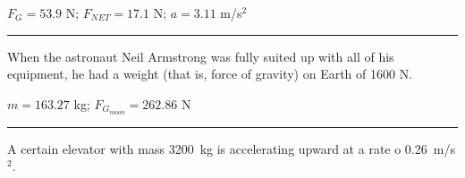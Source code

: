 \documentclass[12pt]{exam}
\newcommand{\h}{$\heartsuit$}
\renewcommand{\d}{$\diamondsuit$}
\newcommand{\s}{$\spadesuit$}
\renewcommand{\ku}[3]{
  \ifprintanswers
    #1 #2 #3
  \else
    \begin{tabular}
      {p{.2\textwidth}|p{.2\textwidth}|p{.2\textwidth}}
      \small Knowns/Unknowns    &
      \small  Plug \& Chug      & 
      \small Answer w/ Units \\
      \center #1 &
      \center #2 &
      \center #3 \\[3em]
    \end{tabular}
  \fi
}
\begin{document}
\begin{questions}

  \begin{solution}
    $F_G=53.9$ N; $F_{NET}=17.1$ N; $a=3.11$ m/s$^2$
  \end{solution}

\vs
\ifprintanswers
  \hrule \vs
\else
  \pagebreak

\fi

\question
  When the astronaut Neil Armstrong was fully suited up with all of his equipment, he had a weight (that is, force of gravity) on Earth of 1600 N.


  \begin{solution}
    $m=163.27$ kg; $F_{G_{moon}}=262.86$ N
  \end{solution}


\vs \hrule \vs

\question
  A certain elevator with mass 3200~kg is accelerating upward at a rate o 0.26~m/s$^2$.

\end{questions}
\end{document}
